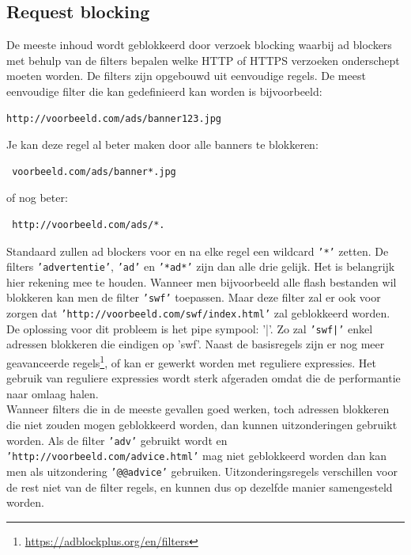 \documentclass[pdftex,a4paper,12pt,twoside]{report}
\begin{document}
\subsection{Request blocking}
\label{sec:Request blocking}
De meeste inhoud wordt geblokkeerd door verzoek blocking waarbij ad blockers met behulp van de filters bepalen welke HTTP of HTTPS verzoeken onderschept moeten worden. De filters zijn opgebouwd uit eenvoudige regels. De meest eenvoudige filter die kan gedefinieerd kan worden is bijvoorbeeld:
\lstset{language=Html,tabsize=2}  
\begin{lstlisting}
http://voorbeeld.com/ads/banner123.jpg
\end{lstlisting}
Je kan deze regel al beter maken door alle banners te blokkeren:
\lstset{language=Html,tabsize=2}  
\begin{lstlisting}
 voorbeeld.com/ads/banner*.jpg 
\end{lstlisting}
 of nog beter:
\lstset{language=Html,tabsize=2}  
\begin{lstlisting}
 http://voorbeeld.com/ads/*.
\end{lstlisting}
Standaard zullen ad blockers voor en na elke regel een wildcard \texttt{'*'} zetten. De filters \texttt{'advertentie'}, \texttt{'ad'} en \texttt{'*ad*'} zijn dan alle drie gelijk. Het is belangrijk hier rekening mee te houden. Wanneer men bijvoorbeeld alle flash bestanden wil blokkeren kan men de filter \texttt{'swf'} toepassen. Maar deze filter zal er ook voor zorgen dat \texttt{'http://voorbeeld.com/swf/index.html'} zal geblokkeerd worden. De oplossing voor dit probleem is het pipe sympool: '|'. Zo zal \texttt{'swf|'} enkel adressen blokkeren die eindigen op 'swf'.
Naast de basisregels zijn er nog meer geavanceerde regels\footnote{\url{https://adblockplus.org/en/filters}}, of kan er gewerkt worden met reguliere expressies. Het gebruik van reguliere expressies wordt sterk afgeraden omdat die de performantie naar omlaag halen.
\\
Wanneer filters die in de meeste gevallen goed werken, toch adressen blokkeren die niet zouden mogen geblokkeerd worden, dan kunnen uitzonderingen gebruikt worden. Als de filter \texttt{'adv'} gebruikt wordt en \texttt{'http://voorbeeld.com/advice.html'} mag niet geblokkeerd worden dan kan men als uitzondering \texttt{'@@advice'} gebruiken. Uitzonderingsregels verschillen voor de rest niet van de filter regels, en kunnen dus op dezelfde manier samengesteld worden.
\end{document}
